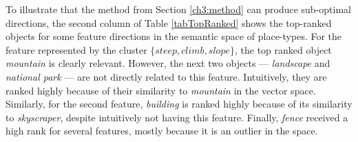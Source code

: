 To illustrate that the method from Section \ref{ch3:method} can produce sub-optimal directions, the second column of Table \ref{tabTopRanked} shows the top-ranked objects for some feature directions in the semantic space of place-types. For the feature represented by the cluster $\{\textit{steep},\textit{climb},\textit{slope}\}$, the top ranked object \textit{mountain} is clearly relevant. However, the next two objects --- \textit{landscape} and \textit{national park} --- are not directly related to this feature. Intuitively, they are ranked highly because of their similarity to \textit{mountain} in the vector space. Similarly, for the second feature, \textit{building} is ranked highly because of its similarity to \textit{skyscraper}, despite intuitively not having this feature. Finally, \textit{fence} received a high rank for several features,  mostly because it is an outlier in the space. 



